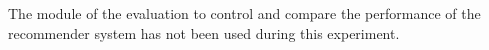 



The module of the evaluation to control and compare the performance of the recommender
system has not been used during this experiment.
\hfill\break
\hfill\break


